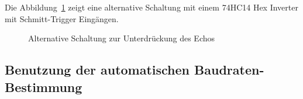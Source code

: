 Die Abbildung~\ref{fig:onewire2} zeigt eine alternative Schaltung mit einem 74HC14 Hex Inverter mit Schmitt-Trigger Eingängen.

\begin{figure}[H]
\centering
{}
\caption{Alternative Schaltung zur Unterdrückung des Echos}
\label{fig:onewire2}
\end{figure}


\subsection{Benutzung der automatischen Baudraten-Bestimmung}
\label{sec:autobaud}

